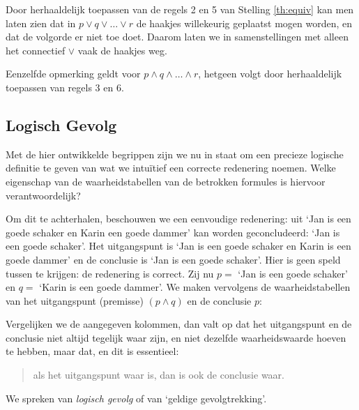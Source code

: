 Door herhaaldelijk toepassen van de regels 2 en 5 van Stelling \ref{th:equiv} kan men laten zien dat in $p\lor q\lor\ldots\lor r$ de haakjes willekeurig geplaatst mogen worden, en dat de volgorde er niet toe doet. Daarom laten we in samenstellingen met alleen het connectief $\lor$ vaak de haakjes weg.

Eenzelfde opmerking geldt voor $p\land q\land\ldots\land r$, hetgeen volgt door herhaaldelijk toepassen van regels 3 en 6.

\subsection{Logisch Gevolg}
Met de hier ontwikkelde begrippen zijn we nu in staat om een precieze logische definitie te geven van wat we intu\"itief een correcte redenering noemen. Welke eigenschap van de waarheidstabellen van de betrokken formules is hiervoor verantwoordelijk?

Om dit te achterhalen, beschouwen we een eenvoudige redenering: uit `Jan is een goede schaker en Karin een goede dammer' kan worden geconcludeerd: `Jan is een goede schaker'. Het uitgangspunt is `Jan is een goede schaker en Karin is een goede dammer' en de conclusie is `Jan is een goede schaker'. Hier is geen speld tussen te krijgen: de redenering is correct. Zij nu $p =$ `Jan is een goede schaker' en $q =$ `Karin is een goede dammer'. We maken vervolgens de waarheidstabellen van het uitgangspunt (premisse) $(p\land q)$ en de conclusie $p$:\\

Vergelijken we de aangegeven kolommen, dan valt op dat het uitgangspunt en de conclusie niet altijd tegelijk waar zijn, en niet dezelfde waarheidswaarde hoeven te hebben, maar dat, en dit is essentieel:
\begin{quote}
als het uitgangspunt waar is, dan is ook de conclusie waar.
\end{quote}
We spreken van \textit{logisch gevolg} of van `geldige gevolgtrekking'.

